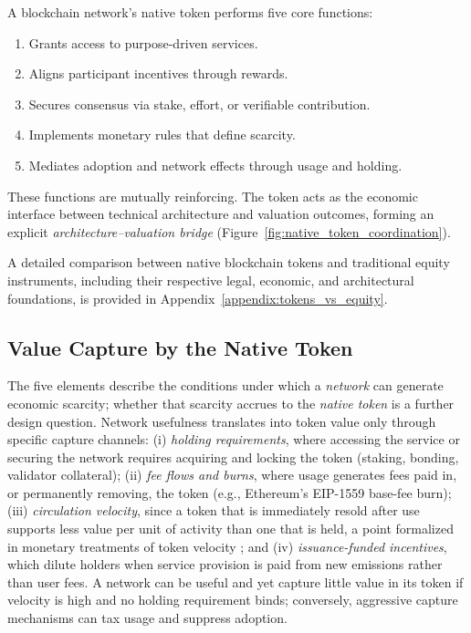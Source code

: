 \documentclass[12pt]{article}
\begin{document}
\begin{tcolorbox}[title=\textbf{Definition (Functional Role of the Native Token)}]
A blockchain network’s native token performs five core functions:
\begin{enumerate}
    \item Grants access to purpose-driven services.
    \item Aligns participant incentives through rewards.
    \item Secures consensus via stake, effort, or verifiable contribution.
    \item Implements monetary rules that define scarcity.
    \item Mediates adoption and network effects through usage and holding.
\end{enumerate}
\end{tcolorbox}

These functions are mutually reinforcing. The token acts as the economic interface between technical architecture and valuation outcomes, forming an explicit \textit{architecture--valuation bridge} (Figure~\ref{fig:native_token_coordination}).

A detailed comparison between native blockchain tokens and traditional equity instruments, including their respective legal, economic, and architectural foundations, is provided in Appendix~\ref{appendix:tokens_vs_equity}.

\subsection{Value Capture by the Native Token}
\label{subsec:value_capture}

The five elements describe the conditions under which a \emph{network} can generate economic scarcity; whether that scarcity accrues to the \emph{native token} is a further design question. Network usefulness translates into token value only through specific capture channels: (i) \textit{holding requirements}, where accessing the service or securing the network requires acquiring and locking the token (staking, bonding, validator collateral); (ii) \textit{fee flows and burns}, where usage generates fees paid in, or permanently removing, the token (e.g., Ethereum's EIP-1559 base-fee burn); (iii) \textit{circulation velocity}, since a token that is immediately resold after use supports less value per unit of activity than one that is held, a point formalized in monetary treatments of token velocity \citep{cong2021tokenomics}; and (iv) \textit{issuance-funded incentives}, which dilute holders when service provision is paid from new emissions rather than user fees. A network can be useful and yet capture little value in its token if velocity is high and no holding requirement binds; conversely, aggressive capture mechanisms can tax usage and suppress adoption.
\end{document}
